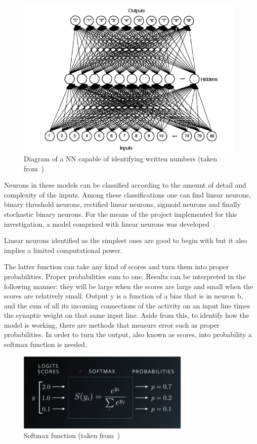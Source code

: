\begin{figure}[htbp]
  \centering
  \includegraphics[width=\textwidth]{images/net}
  \caption{ Diagram of a \acl{NN} capable of identifying written numbers (taken from~\cite{freeman91}) }
  \label{fig:neuronNet}
\end{figure}

Neurons in these models can be classified according to the amount of detail and complexity of the inputs. Among these classifications one can find linear neurons, binary threshold neurons, rectified linear neurons, sigmoid neurons and finally stochastic binary neurons. For the means of the project implemented for this investigation, a model comprised with linear neurons was developed~\cite{hinton13}. 

Linear neurons identified as the simplest ones are good to begin with but it also implies a limited computational power.

The latter function can take any kind of scores and turn them into proper probabilities. Proper probabilities sum to one.  Results can be interpreted in the following manner: they will be large when the scores are large and small when the scores are relatively small. 
Output y is a function of a bias that is in neuron b, and the sum of all its incoming connections of the activity on an input line times the synaptic weight on that same input line. Aside from this, to identify how the model is working, there are methods that measure error such as proper probabilities. In order to turn the output, also known as scores, into probability a softmax function is needed.

\begin{figure}[htbp]
  \centering
  \includegraphics[width=0.75\textwidth]{images/softmax}
  \caption{ Softmax function (taken from~\cite{hinton13}) }
  \label{fig:softmax}
\end{figure}

